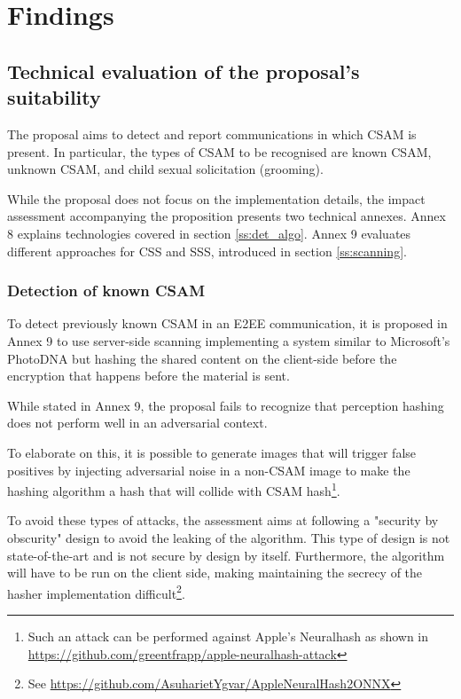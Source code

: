 \section{Findings}

\subsection{Technical evaluation of the proposal's suitability}

The proposal aims to detect and report communications in which CSAM is present. In particular, the types of CSAM to be recognised are known CSAM, unknown CSAM, and child sexual solicitation (grooming).

While the proposal does not focus on the implementation details, the impact assessment accompanying the proposition presents two technical annexes. Annex 8 explains technologies covered in section \ref{ss:det_algo}. Annex 9 evaluates different approaches for CSS and SSS, introduced in section \ref{ss:scanning}.

\subsubsection{Detection of known CSAM}
\label{sss:known_csam}

To detect previously known CSAM in an E2EE communication, it is proposed in Annex 9 to use server-side scanning implementing a system similar to Microsoft's PhotoDNA but hashing the shared content on the client-side before the encryption that happens before the material is sent\cite{eu2022impact}. 

While stated in Annex 9, the proposal fails to recognize that perception hashing does not perform well in an adversarial context. 

To elaborate on this, it is possible to generate images that will trigger false positives by injecting adversarial noise in a non-CSAM image to make the hashing algorithm a hash that will collide with CSAM hash\footnote{Such an attack can be performed against Apple's Neuralhash as shown in \url{https://github.com/greentfrapp/apple-neuralhash-attack}}.

To avoid these types of attacks, the assessment aims at following a "security by obscurity" design to avoid the leaking of the algorithm. This type of design is not state-of-the-art and is not secure by design by itself\cite{SandO}. Furthermore, the algorithm will have to be run on the client side, making maintaining the secrecy of the hasher implementation difficult\footnote{See \url{https://github.com/AsuharietYgvar/AppleNeuralHash2ONNX}}.

